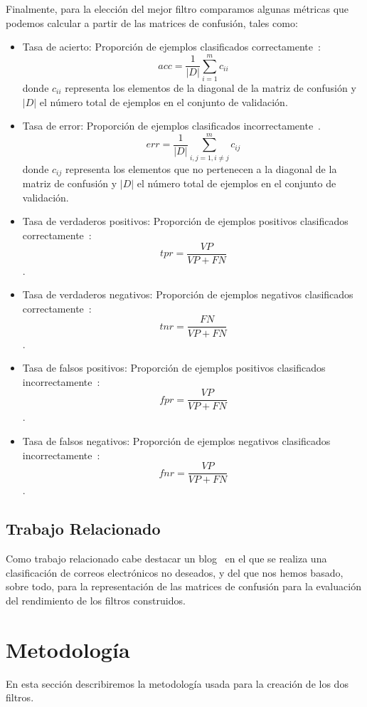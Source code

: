 \documentclass[conference,a4paper]{IEEEtran}
\begin{document}
Finalmente, para la elección del mejor filtro comparamos algunas métricas que podemos calcular a partir de las matrices de confusión, tales como:
\begin{itemize}
\item Tasa de acierto: Proporción de ejemplos clasificados correctamente~\cite{b2}: \[ acc = \frac{1}{|D|} \sum_{i=1}^{m} c_{ii} \]
donde $c_{ii}$ representa los elementos de la diagonal de la matriz de confusión y $|D|$ el número total de ejemplos en el conjunto de validación.
\item Tasa de error: Proporción de ejemplos clasificados incorrectamente~\cite{b2}. \[ err = \frac{1}{|D|} \sum_{i,j=1, i\neq j}^{m} c_{ij} \]
donde $c_{ij}$ representa los elementos que no pertenecen a la diagonal de la matriz de confusión y $|D|$ el número total de ejemplos en el conjunto de validación.
\item Tasa de verdaderos positivos: Proporción de ejemplos positivos clasificados correctamente~\cite{b2}: $$tpr = \frac{VP}{VP+FN}$$.
\item Tasa de verdaderos negativos: Proporción de ejemplos negativos clasificados correctamente~\cite{b2}: $$tnr = \frac{FN}{VP+FN}$$.
\item Tasa de falsos positivos: Proporción de ejemplos positivos clasificados incorrectamente~\cite{b2}: $$fpr = \frac{VP}{VP+FN}$$.
\item Tasa de falsos negativos: Proporción de ejemplos negativos clasificados incorrectamente~\cite{b2}: $$fnr = \frac{VP}{VP+FN}$$.
\end{itemize}

\subsection{Trabajo Relacionado}

Como trabajo relacionado cabe destacar un blog~\cite{b10} en el que se realiza una clasificación de correos electrónicos no deseados, y del que nos hemos basado, sobre todo, para la representación de las matrices de confusión para la evaluación del rendimiento de los filtros construidos.

\section{Metodología}
En esta sección describiremos la metodología usada para la creación de los dos filtros. \\
\end{document}
